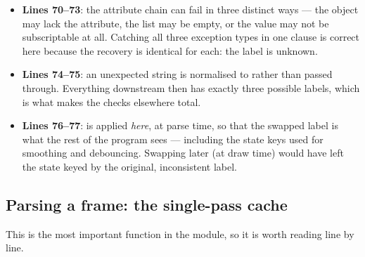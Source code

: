 \begin{codecard}

\end{codecard}

\begin{itemize}
  \item \textbf{Lines 70--73}: the attribute chain  can fail
        in three distinct ways --- the object may lack the attribute, the list may be empty, or the
        value may not be subscriptable at all. Catching all three exception types in one clause is
        correct here because the recovery is identical for each: the label is unknown.
  \item \textbf{Lines 74--75}: an unexpected string is normalised to  rather than
        passed through. Everything downstream then has exactly three possible labels, which is what
        makes the  checks elsewhere total.
  \item \textbf{Lines 76--77}:  is applied \emph{here}, at parse time, so
        that the swapped label is what the rest of the program sees --- including the state keys used
        for smoothing and debouncing. Swapping later (at draw time) would have left the state keyed
        by the original, inconsistent label.
\end{itemize}

\subsection{Parsing a frame: the single-pass cache}

\begin{codecard}

\end{codecard}

This is the most important function in the module, so it is worth reading line by line.

